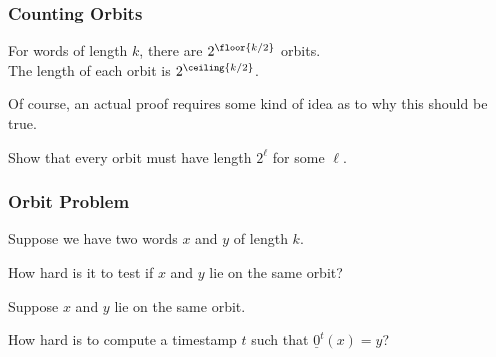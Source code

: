 \documentclass[handout,10pt]{ksbeamer}
\let\ov=\underline
\def\F#1{\underline{#1}}
\begin{document}



\begin{frame}
\frametitle{Counting Orbits}

\begin{conjecture}
For words of length $k$, there are $2^{\floor{k/2}}$ orbits. \\[1ex]
The length of each orbit is $2^{\ceiling{k/2}}$.
\end{conjecture}
\vspace{8ex} 

Of course, an actual proof requires some kind of idea as to why 
this should be true.  
\vspace{5ex} 

\begin{exercise}
Show that every orbit must have length $2^{\ell}$ for some $\ell$. 
\end{exercise}

\end{frame}



\begin{frame}
\frametitle{Orbit  Problem}

Suppose we have two words $x$ and $y$ of length $k$.
\vspace{2ex} 

\begin{graybox}
How hard is it to test if $x$ and $y$ lie on the same orbit? 
\end{graybox}
\vspace{8ex} 


Suppose  $x$ and $y$ lie on the same orbit. 
\vspace{2ex} 


\begin{graywidthbox}{0.9}
How hard is to compute a timestamp $t$ such that 
$\F{0}^{t}(x) = y$? 
\end{graywidthbox}
\vspace{5ex} 

\end{frame}
\end{document}
